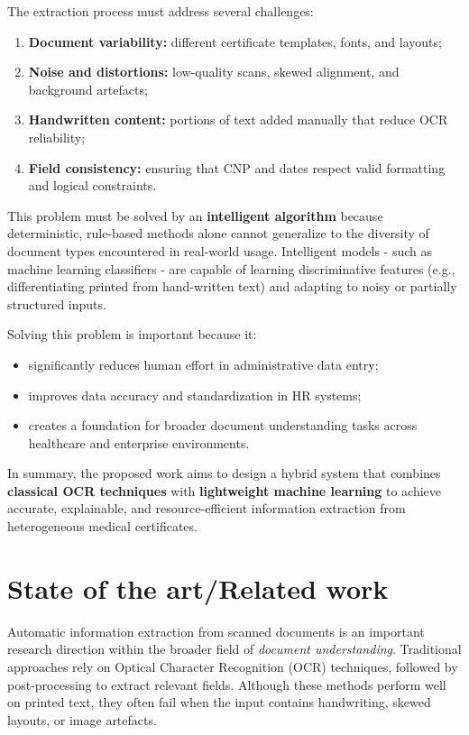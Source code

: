 \documentclass[runningheads,a4paper,11pt]{report}
\begin{document}
\bigskip
\noindent
The extraction process must address several challenges:
\begin{enumerate}
  \item \textbf{Document variability:} different certificate templates, fonts, and layouts;
  \item \textbf{Noise and distortions:} low-quality scans, skewed alignment, and background artefacts;
  \item \textbf{Handwritten content:} portions of text added manually that reduce OCR reliability;
  \item \textbf{Field consistency:} ensuring that CNP and dates respect valid formatting and logical constraints.
\end{enumerate}

\bigskip
This problem must be solved by an \textbf{intelligent algorithm} because deterministic, rule-based methods alone cannot generalize to the diversity of document types encountered in real-world usage.
Intelligent models - such as machine learning classifiers - are capable of learning discriminative features (e.g., differentiating printed from hand-written text) and adapting to noisy or partially structured inputs.

\bigskip
Solving this problem is important because it:
\begin{itemize}
  \item significantly reduces human effort in administrative data entry;
  \item improves data accuracy and standardization in HR systems;
  \item creates a foundation for broader document understanding tasks across healthcare and enterprise environments.
\end{itemize}

\bigskip
\noindent
In summary, the proposed work aims to design a hybrid system that combines \textbf{classical OCR techniques} with \textbf{lightweight machine learning} to achieve accurate, explainable, and resource-efficient information extraction from heterogeneous medical certificates.


\chapter{State of the art/Related work}
\label{chapter:stateOfArt}

Automatic information extraction from scanned documents is an important research direction within the broader field of \textit{document understanding}.
Traditional approaches rely on Optical Character Recognition (OCR) techniques, followed by post-processing to extract relevant fields.
Although these methods perform well on printed text, they often fail when the input contains handwriting, skewed layouts, or image artefacts.
\end{document}
